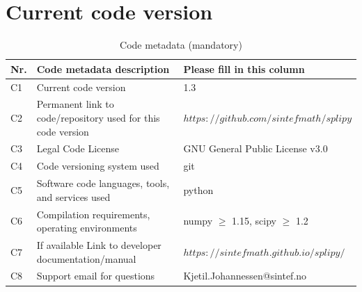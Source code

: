 \documentclass[preprint,12pt, a4paper]{elsarticle}
\begin{document}






\section*{Current code version}
\label{}


\begin{table}[!h]
\begin{tabular}{|l|p{5.5cm}|p{7.5cm}|}
\hline
\textbf{Nr.} & \textbf{Code metadata description} & \textbf{Please fill in this column} \\
\hline
C1 & Current code version & 1.3 \\
\hline
C2 & Permanent link to code/repository used for this code version & $https://github.com/sintefmath/splipy$ \\
\hline
C3 & Legal Code License   & GNU General Public License v3.0  \\
\hline
C4 & Code versioning system used & git \\
\hline
C5 & Software code languages, tools, and services used & python \\
\hline
C6 & Compilation requirements, operating environments & numpy $\geq$ 1.15, scipy $\geq$ 1.2 \\
\hline
C7 & If available Link to developer documentation/manual & $https://sintefmath.github.io/splipy/$ \\
\hline
C8 & Support email for questions & Kjetil.Johannessen@sintef.no \\
\hline
\end{tabular}
\caption{Code metadata (mandatory)}
\label{}
\end{table}

%
%
\end{document}
